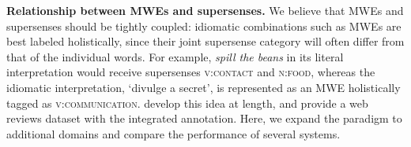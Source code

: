\documentclass[11pt,letterpaper]{article}
\newcommand{\sst}[1]{\textsc{#1}} %
\newcommand{\lex}[1]{\textit{#1}} %
\newcommand{\longversion}[1]{#1} %
\begin{document}
% 
% 


\textbf{Relationship between MWEs and supersenses.}
We believe that MWEs and supersenses should be tightly coupled:
idiomatic combinations such as MWEs are best labeled holistically,
since their joint supersense category will often differ from that of the individual words.
For example, \lex{spill the beans} in its literal interpretation
would receive supersenses \sst{v:contact} and \sst{n:food},
whereas the idiomatic interpretation, `divulge a secret', is represented as
an MWE holistically tagged as \sst{v:communication}.
 develop this idea at length, and provide a web reviews dataset
with the integrated annotation. Here, we expand the paradigm to additional domains
and compare the performance of several systems.
\end{document}
